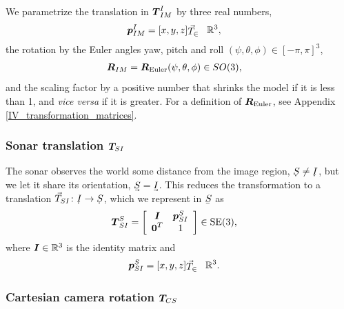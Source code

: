 We parametrize the translation in $\boldsymbol{T}_{IM}^I$ by three real numbers,
%
\begin{align}
\dvec{p}_{IM}^I &= [x,y,z]\T \in \mathbb{R}^3,
\end{align}
%
the rotation by the Euler angles yaw, pitch and roll $(\psi,\theta,\phi) \in [-\pi,\pi]^3$,
%
\begin{align}
\boldsymbol{R}_{IM}    &= \boldsymbol{R}_{\mathrm{Euler}}(\psi,\theta,\phi) \in SO(3),
\end{align}
%
and the scaling factor by a positive number that shrinks the model if it is less than 1, and \emph{vice versa} if it is greater. For a definition of $\boldsymbol{R}_{\mathrm{Euler}}$, see Appendix \ref{IV_transformation_matrices}.


\subsubsection{Sonar translation $\boldsymbol{T}_{\!SI}$}

The sonar observes the world some distance from the image region, $\udot{S}\ne\udot{I}$, but we let it share its orientation, $\uvec{S}=\uvec{I}$. This reduces the transformation to a translation $\vec{T}_{SI}\colon \udot{I}\to\udot{S}$, which we represent in $\ubar{S}$ as
%
\begin{align}
\dvec{T}_{SI}^S &= 
\left[\begin{array}{c c}
 \mat{I}  & \dvec{p}_{SI}^S \\%
 \dvec{0}^T  &  1
\end{array}\right] \in \mathrm{SE}(3), \label{eq_T_SI}
\end{align}
%
where $\boldsymbol{I}\in\mathbb{R}^3$ is the identity matrix and 
%
\begin{align}
\dvec{p}_{SI}^S &= [x,y,z]\T \in \mathbb{R}^3.
\end{align}
%


\subsubsection{Cartesian camera rotation $\boldsymbol{T}_{\!CS}$}


